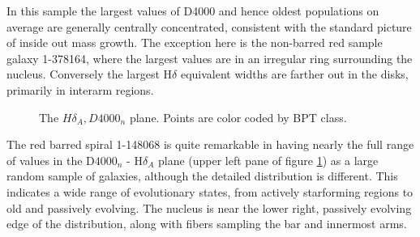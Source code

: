 \documentclass[modern]{aastex62}
\begin{document}
In this sample the largest values of D4000 and hence oldest populations on average are generally centrally concentrated, consistent with the standard picture of inside out mass growth. The exception here is the non-barred red sample galaxy 1-378164, where the largest values are in an irregular ring surrounding the nucleus. Conversely the largest H$\delta$ equivalent widths are farther out in the disks, primarily in interarm regions.

\begin{figure}[ht]
\centering
{}
\caption{The $H\delta_A, D4000_n$ plane. Points are color coded by BPT class.}
\label{fig:d4000hd}
\end{figure}

The red barred spiral 1-148068 is quite remarkable in having nearly the full range of values in the D$4000_n$ - H$\delta_A$ plane (upper left pane of figure \ref{fig:d4000hd}) as a large random sample of galaxies, although the detailed distribution is different. This indicates a wide range of evolutionary states, from actively starforming regions to old and passively evolving. The nucleus is near the lower right, passively evolving edge of the distribution, along with fibers sampling the bar and innermost arms.
\end{document}
